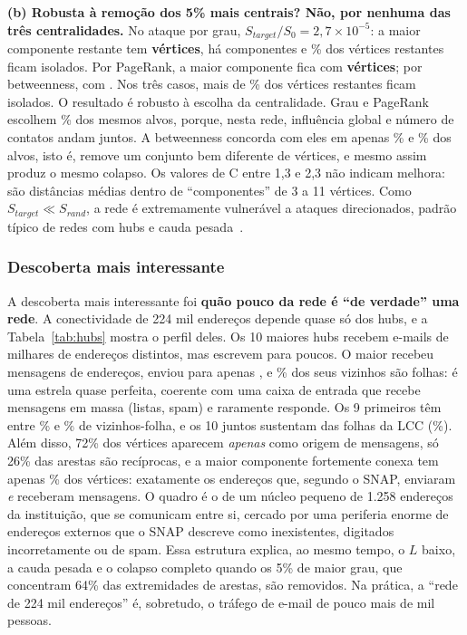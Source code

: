\documentclass[sigconf]{webmedia}
\begin{document}
\textbf{(b) Robusta à remoção dos 5\% mais centrais? Não, por nenhuma das três
centralidades.} No ataque por grau, $S_{target}/S_0 = 2{,}7\times10^{-5}$: a maior
componente restante tem \textbf{\maiorCompGrau{} vértices}, há \compAtaqueGrau{} componentes e \pctIsolGrau\% dos
vértices restantes ficam isolados. Por PageRank, a maior componente fica com
\textbf{\maiorCompPr{} vértices}; por betweenness, com \textbf{\maiorCompBtw}. Nos três casos, mais de \pctIsolMin\%
dos vértices restantes ficam isolados. O resultado é robusto à escolha da centralidade.
Grau e PageRank escolhem \sobrepGrauPr\% dos mesmos alvos, porque, nesta rede, influência global e
número de contatos andam juntos. A betweenness concorda com eles em apenas \sobrepGrauBtw\% e \sobrepPrBtw\%
dos alvos, isto é, remove um conjunto bem diferente de vértices, e mesmo assim produz o
mesmo colapso. Os valores de C entre 1,3 e 2,3 não indicam melhora: são distâncias
médias dentro de ``componentes'' de 3 a 11 vértices. Como $S_{target} \ll S_{rand}$, a
rede é extremamente vulnerável a ataques direcionados, padrão típico de redes com hubs e
cauda pesada~\cite{albert2000}.

\subsubsection{Descoberta mais interessante}
A descoberta mais interessante foi \textbf{quão pouco da rede é ``de verdade'' uma rede}.
A conectividade de 224 mil endereços depende quase só dos hubs, e a
Tabela~\ref{tab:hubs} mostra o perfil deles. Os 10 maiores hubs recebem e-mails de
milhares de endereços distintos, mas escrevem para poucos. O maior recebeu mensagens de
\hubRemetentes{} endereços, enviou para apenas \hubDestinatarios, e \hubFolhas\% dos seus vizinhos são folhas: é uma
estrela quase perfeita, coerente com uma caixa de entrada que recebe mensagens em massa
(listas, spam) e raramente responde. Os 9 primeiros têm entre \folhasMinTopNove\% e \hubFolhas\% de
vizinhos-folha, e os 10 juntos sustentam \folhasTopDez{} das \nFolhasDeduzidas{} folhas da LCC (\pctFolhasTopDez\%). Além
disso, 72\% dos vértices aparecem
\emph{apenas} como origem de mensagens, só 26\% das arestas são recíprocas, e a maior
componente fortemente conexa tem apenas \pctMaiorScc\% dos vértices: exatamente os \maiorScc
endereços que, segundo o SNAP, enviaram \emph{e} receberam mensagens. O quadro é o de um
núcleo pequeno de 1.258 endereços da instituição, que se comunicam entre si, cercado por
uma periferia enorme de endereços externos que o SNAP descreve como inexistentes,
digitados incorretamente ou de spam. Essa estrutura explica, ao mesmo tempo, o $L$
baixo, a cauda pesada e o colapso completo quando os 5\% de maior grau, que concentram
64\% das extremidades de arestas, são removidos. Na prática, a ``rede de 224 mil
endereços'' é, sobretudo, o tráfego de e-mail de pouco mais de mil pessoas.
\end{document}
